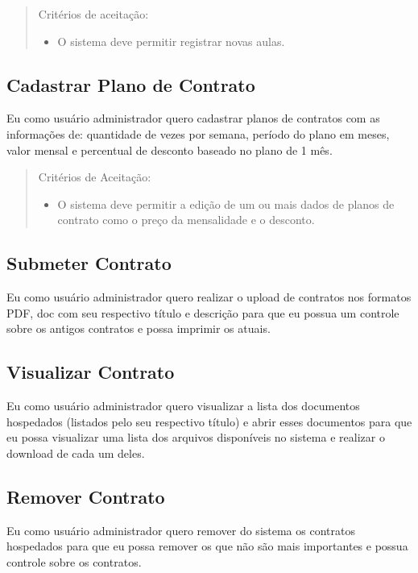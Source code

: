 \begin{quote}
Critérios de aceitação:
    \begin{itemize}
        \item O sistema deve permitir registrar novas aulas.
    \end{itemize}
\end{quote}

\subsection[Cadastrar Plano de Contrato]{Cadastrar Plano de Contrato}
Eu como usuário administrador quero cadastrar planos de contratos com as
informações de: quantidade de vezes por semana, período do plano em meses,
valor mensal e percentual de desconto baseado no plano de 1 mês.

\begin{quote}
Critérios de Aceitação:
    \begin{itemize}
        \item O sistema deve permitir a edição de um ou mais dados de planos de contrato
        como o preço da mensalidade e o desconto.
    \end{itemize}
\end{quote}

\subsection[Submeter Contrato]{Submeter Contrato}
Eu como usuário administrador quero realizar o upload de contratos nos formatos
PDF, doc com seu respectivo título e descrição para que eu possua um controle
sobre os antigos contratos e possa imprimir os atuais.

\subsection[Visualizar Contrato]{Visualizar Contrato}
Eu como usuário administrador quero visualizar a lista dos documentos hospedados
(listados pelo seu respectivo título) e abrir esses documentos para que eu possa
visualizar uma lista dos arquivos disponíveis no sistema e realizar o download
de cada um deles.

\subsection[Remover Contrato]{Remover Contrato}
Eu como usuário administrador quero remover do sistema os contratos hospedados
para que eu possa remover os que não são mais importantes e possua controle
sobre os contratos.

